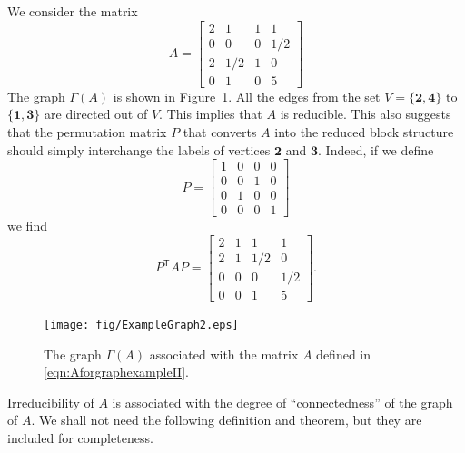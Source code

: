 \begin{xexample}
We consider the matrix
\begin{equation}
    A = \begin{bmatrix}
             2 & 1 & 1 & 1\\
             0 & 0 & 0 & 1/2 \\
             2 & 1/2 & 1 & 0 \\
             0 & 1 & 0 & 5
        \end{bmatrix}
\label{eqn:AforgraphexampleII}
\end{equation}
The graph $\Gamma(A)$ is shown in Figure~\ref{fig:graphexampleII}.
All the edges from the set $V = \{\textbf{2},\textbf{4}\}$
to $\{\textbf{1},\textbf{3}\}$ are directed out of $V$.
This implies that $A$ is reducible.
This also suggests that the permutation
matrix $P$ that converts $A$ into the reduced block structure
should simply interchange the labels of vertices
$\textbf{2}$ and $\textbf{3}$.  Indeed, if we define
\begin{equation}
   P = \begin{bmatrix}
            1 & 0 & 0 & 0 \\
            0 & 0 & 1 & 0 \\
            0 & 1 & 0 & 0 \\
            0 & 0 & 0 & 1
       \end{bmatrix}
\end{equation}
we find
\begin{equation}
  P^{\textsf{T}}AP = 
      \begin{bmatrix}
              2 & 1 & 1 & 1 \\
              2 & 1 & 1/2 & 0 \\
              0 & 0 & 0 & 1/2 \\
              0 & 0 & 1 & 5
      \end{bmatrix}.
\end{equation}
\end{xexample}

\begin{figure}
\centerline{\texttt{[image: fig/ExampleGraph2.eps]}}
\caption{The graph $\Gamma(A)$ associated with the matrix $A$ defined
in \eqref{eqn:AforgraphexampleII}.}
\label{fig:graphexampleII}
\end{figure}


Irreducibility of $A$ is associated with the degree of ``connectedness''
of the graph of $A$. We shall not need the following definition and
theorem, but they are included for completeness.

